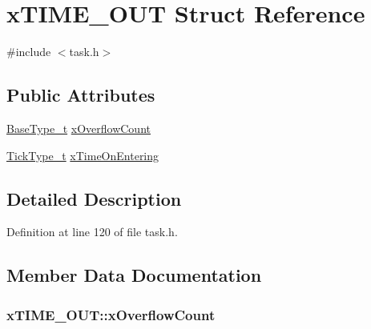 \hypertarget{structx_t_i_m_e___o_u_t}{}\section{x\+T\+I\+M\+E\+\_\+\+O\+UT Struct Reference}
\label{structx_t_i_m_e___o_u_t}


{\ttfamily \#include $<$task.\+h$>$}

\subsection*{Public Attributes}
\begin{DoxyCompactItemize}
\item 
\hyperlink{_g_c_c_2_a_r_m___c_m3_2portmacro_8h_a46fb21e00ae0729d7515c0fbf2269796}{Base\+Type\+\_\+t} \hyperlink{structx_t_i_m_e___o_u_t_a9289c6f97096a9b3e3fc705d0bc5a160}{x\+Overflow\+Count}
\item 
\hyperlink{_g_c_c_2_a_r_m___c_m3_2portmacro_8h_aa69c48c6e902ce54f70886e6573c92a9}{Tick\+Type\+\_\+t} \hyperlink{structx_t_i_m_e___o_u_t_a3464939ca050f7bcc6ffe0d8d3766337}{x\+Time\+On\+Entering}
\end{DoxyCompactItemize}


\subsection{Detailed Description}


Definition at line 120 of file task.\+h.



\subsection{Member Data Documentation}
\subsubsection[{\texorpdfstring{x\+Overflow\+Count}{xOverflowCount}}]{ x\+T\+I\+M\+E\+\_\+\+O\+U\+T\+::x\+Overflow\+Count}\hypertarget{structx_t_i_m_e___o_u_t_a9289c6f97096a9b3e3fc705d0bc5a160}{}\label{structx_t_i_m_e___o_u_t_a9289c6f97096a9b3e3fc705d0bc5a160}


